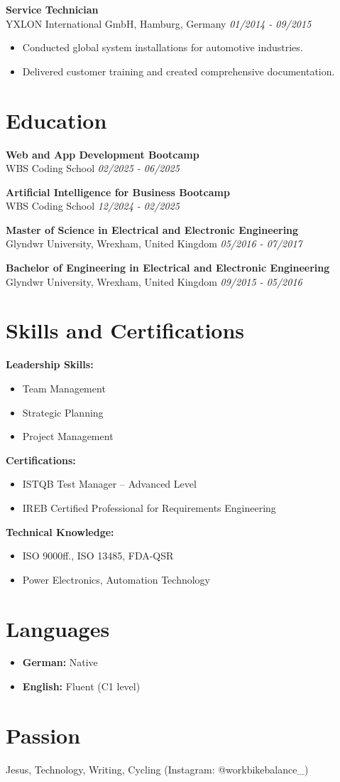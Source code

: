 \documentclass[a4paper,10pt]{article}
\begin{document}
\textbf{Service Technician} \\
YXLON International GmbH, Hamburg, Germany \hfill \textit{01/2014 - 09/2015}
\begin{itemize}
    \item Conducted global system installations for automotive industries.
    \item Delivered customer training and created comprehensive documentation.
\end{itemize}

\section*{Education}
\textbf{Web and App Development Bootcamp} \\
WBS Coding School \hfill \textit{02/2025 - 06/2025} 

\textbf{Artificial Intelligence for Business Bootcamp} \\
WBS Coding School \hfill \textit{12/2024 - 02/2025} 

\textbf{Master of Science in Electrical and Electronic Engineering} \\
Glyndwr University, Wrexham, United Kingdom \hfill \textit{05/2016 - 07/2017} 

\textbf{Bachelor of Engineering in Electrical and Electronic Engineering} \\
Glyndwr University, Wrexham, United Kingdom \hfill \textit{09/2015 - 05/2016}

\section*{Skills and Certifications}
\textbf{Leadership Skills:}
\begin{itemize}
    \item Team Management
    \item Strategic Planning
    \item Project Management
\end{itemize}

\textbf{Certifications:}
\begin{itemize}
    \item ISTQB Test Manager – Advanced Level
    \item IREB Certified Professional for Requirements Engineering
\end{itemize}

\textbf{Technical Knowledge:}
\begin{itemize}
    \item ISO 9000ff., ISO 13485, FDA-QSR
    \item Power Electronics, Automation Technology
\end{itemize}

\section*{Languages}
\begin{itemize}
    \item \textbf{German:} Native
    \item \textbf{English:} Fluent (C1 level)
\end{itemize}

\section*{Passion}
Jesus, Technology, Writing, Cycling (Instagram: @workbikebalance\_)
\end{document}
